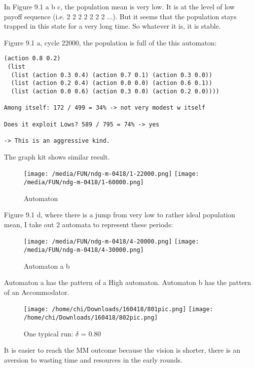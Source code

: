 \documentclass[12.5pt]{report}
\begin{document}
In Figure 9.1 a b c, the population mean is very low. It is at the level of low payoff sequence (i.e. 2 2 2 2 2 2 2 ...). But it seems that the population stays trapped in this state for a very long time. So whatever it is, it is stable.

Figure 9.1 a, cycle 22000, the population is full of the this automaton:

\begin{verbatim}
(action 0.8 0.2)
 (list
  (list (action 0.3 0.4) (action 0.7 0.1) (action 0.3 0.0))
  (list (action 0.2 0.4) (action 0.0 0.0) (action 0.6 0.1))
  (list (action 0.0 0.6) (action 0.3 0.0) (action 0.2 0.0))))
  
Among itself: 172 / 499 = 34% -> not very modest w itself

Does it exploit Lows? 589 / 795 = 74% -> yes

-> This is an aggressive kind.
\end{verbatim}

The graph kit shows similar result.

\begin{figure}
\center
\texttt{[image: /media/FUN/ndg-m-0418/1-22000.png]}
\texttt{[image: /media/FUN/ndg-m-0418/1-60000.png]}
\caption{Automaton}
\end{figure}

Figure 9.1 d, where there is a jump from very low to rather ideal population mean, I take out 2 automata to represent these periods:

\begin{figure}
\center
\texttt{[image: /media/FUN/ndg-m-0418/4-20000.png]}
\texttt{[image: /media/FUN/ndg-m-0418/4-30000.png]}
\caption{Automaton a b}
\end{figure}

Automaton a has the pattern of a High automaton. Automaton b has the pattern of an Accommodator.



\begin{figure}
\texttt{[image: /home/chi/Downloads/160418/801pic.png]}
\texttt{[image: /home/chi/Downloads/160418/802pic.png]}

\caption{One typical run: $\delta$ = 0.80}
\end{figure}

It is easier to reach the MM outcome because the vision is shorter, there is an aversion to wasting time and resources in the early rounds.
\end{document}
